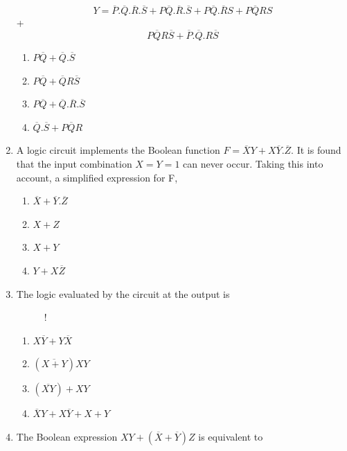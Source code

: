 \documentclass[journal,12pt,twocolumn]{IEEEtran}
\begin{document}
\begin{enumerate}
    $$Y=\overline{P}.\overline{Q}.\overline{R}.\overline{S}+P\overline{Q}.\overline{R}.\overline{S}+P\overline{Q}.\overline{R}S+P\overline{Q}RS$$+$$P\overline{Q}R\overline{S}+\overline{P}.\overline{Q}.R\overline{S}$$
     \begin{enumerate}
      \item $P\overline{Q}+\overline{Q}.\overline{S}$ 
      \item $P\overline{Q}+\overline{Q}R\overline{S}$
      \item $P\overline{Q}+\overline{Q}.\overline{R}.\overline{S}$
      \item $\overline{Q}.\overline{S}+P\overline{Q}R$
    \end{enumerate}
    \item A logic circuit implements the Boolean function $F=\overline{X}Y+X\overline{Y}.\overline{Z}$.
 It is found that the input combination $ X = Y = 1$ can never occur. Taking this into account, a simplified expression for F, 
 \begin{enumerate}
      \item $\overline{X}+\overline{Y}.\overline{Z}$ 
      \item $X+Z$
      \item $X+Y$
      \item $Y+X\overline{Z}$
    \end{enumerate} 
    \item The logic evaluated by the circuit at the output is
    \begin{figure}[!h]
\centering
\resizebox {\columnwidth} {!} {

}
\caption{}
\end{figure}   
                      \begin{enumerate}
      \item $X\overline{Y}+Y\overline{X}$ 
      \item $(\overline{X+Y})XY$
      \item $(\overline{XY})+XY$
      \item $\overline{X}Y+X\overline{Y}+X+Y$
    \end{enumerate}
    \item The Boolean expression $XY+(\overline{X}+\overline{Y})Z$ is equivalent to 

\end{enumerate}
\end{document}
